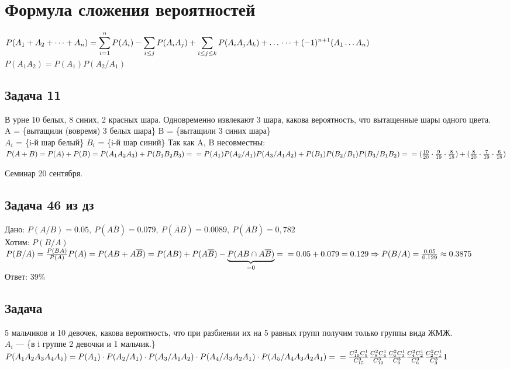\documentclass[12pt, a4paper]{article}
\begin{document}
    \section*{Формула сложения вероятностей}
    $P(A_1 + A_2 + \dots + A_n) =\displaystyle \sum_{i = 1}^{n} P(A_i) - \sum_{i \leq j} P(A_i A_j) + \sum_{i\leq j\leq k} P(A_i A_j A_k) + \dots \\
    \dots + (-1)^{n + 1}(A_1\dots A_n)$\\
    $P(A_1 A_2) = P(A_1)P(A_2/ A_1)$
    \subsection*{Задача 11}
    В урне 10 белых, 8 синих, 2 красных шара. Одновременно извлекают 3 шара, какова вероятность, что вытащенные шары одного цвета.\\
    A = \{вытащили (вовремя) 3 белых шара\}
    B = \{вытащили 3 синих шара\}\\
    $A_i$ = \{i-й шар белый\}
    $B_i$ = \{i-й шар синий\}
    Так как A, B несовместны: $P(A + B) = P(A) + P(B) = P(A_1 A_2 A_3) + P(B_1 B_2 B_3) =\\
    =P(A_1)P(A_2/A_1)P(A_3/A_1 A_2) + P(B_1)P(B_2/ B_1)P(B_3/ B_1 B_2) =\\
    = (\frac{10}{20} \cdot \frac{9}{19} \cdot \frac{8}{18}) + (\frac{8}{20} \cdot \frac{7}{19} \cdot \frac{6}{18})$

    \begin{center}
        Семинар 20 сентября.
    \end{center}

    \subsection*{Задача 46 из дз}
    Дано: $P(A/B) = 0.05,\ P(A\overline{B}) = 0.079,\ P(\overline{A}B) = 0.0089,\ P(\overline{A}\overline{B}) = 0,782$\\
    Хотим: $P(B/A)$\\
    $P(B/A) = \frac{P(BA)}{P(A)}\\
    P(A) = P(AB + A\overline{B}) = P(AB) + P(A\overline{B}) - \underset{=0}{\underbrace{P(AB\cap A\overline{B})}}=\\
    = 0.05 + 0.079 = 0.129\Rightarrow P(B/A) = \frac{0.05}{0.129} \approx 0.3875$\\
    Ответ: $39\%$
    \subsection*{Задача}
    5 мальчиков и 10 девочек, какова вероятность, что при разбиении их на 5 равных групп получим только группы вида ЖМЖ.\\
    $A_i$ --- \{в i группе 2 девочки и 1 мальчик.\}\\
    $P(A_1 A_2 A_3 A_4 A_5) = P(A_1)\cdot P(A_2/ A_1)\cdot P(A_3/ A_1 A_2)\cdot P(A_4/ A_3 A_2 A_1)\cdot P(A_5 / A_4 A_3 A_2 A_1) = \\
    = \frac{C^2_{10} C^1_5}{C^3_{15}} \frac{C^2_{8} C^1_4}{C^3_{12}} \frac{C^2_{6} C^1_3}{C^3_{9}} \frac{C^2_{4} C^1_2}{C^3_{6}} \frac{C^2_{2} C^1_1}{C^3_{3}} 1$\\
\end{document}
